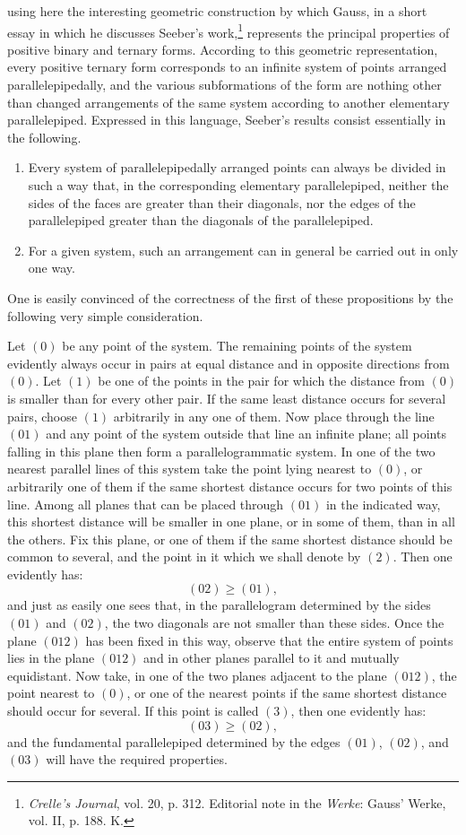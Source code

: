 \documentclass[11pt]{article}
\begin{document}
using here the interesting geometric construction by which Gauss, in a short essay in which he discusses Seeber's work,\footnote{\emph{Crelle's Journal}, vol. 20, p. 312. Editorial note in the \emph{Werke}: Gauss' Werke, vol. II, p. 188. K.} represents the principal properties of positive binary and ternary forms. According to this geometric representation, every positive ternary form corresponds to an infinite system of points arranged parallelepipedally, and the various subformations of the form are nothing other than changed arrangements of the same system according to another elementary parallelepiped. Expressed in this language, Seeber's results consist essentially in the following.

\begin{enumerate}
\item Every system of parallelepipedally arranged points can always be divided in such a way that, in the corresponding elementary parallelepiped, neither the sides of the faces are greater than their diagonals, nor the edges of the parallelepiped greater than the diagonals of the parallelepiped.
\item For a given system, such an arrangement can in general be carried out in only one way.
\end{enumerate}

One is easily convinced of the correctness of the first of these propositions by the following very simple consideration.

Let $(0)$ be any point of the system. The remaining points of the system evidently always occur in pairs at equal distance and in opposite directions from $(0)$. Let $(1)$ be one of the points in the pair for which the distance from $(0)$ is smaller than for every other pair. If the same least distance occurs for several pairs, choose $(1)$ arbitrarily in any one of them. Now place through the line $(01)$ and any point of the system outside that line an infinite plane; all points falling in this plane then form a parallelogrammatic system. In one of the two nearest parallel lines of this system take the point lying nearest to $(0)$, or arbitrarily one of them if the same shortest distance occurs for two points of this line. Among all planes that can be placed through $(01)$ in the indicated way, this shortest distance will be smaller in one plane, or in some of them, than in all the others. Fix this plane, or one of them if the same shortest distance should be common to several, and the point in it which we shall denote by $(2)$. Then one evidently has:
\[
(02) \geq (01),
\]
and just as easily one sees that, in the parallelogram determined by the sides $(01)$ and $(02)$, the two diagonals are not smaller than these sides. Once the plane $(012)$ has been fixed in this way, observe that the entire system of points lies in the plane $(012)$ and in other planes parallel to it and mutually equidistant. Now take, in one of the two planes adjacent to the plane $(012)$, the point nearest to $(0)$, or one of the nearest points if the same shortest distance should occur for several. If this point is called $(3)$, then one evidently has:
\[
(03) \geq (02),
\]
and the fundamental parallelepiped determined by the edges $(01)$, $(02)$, and $(03)$ will have the required properties.
\end{document}
